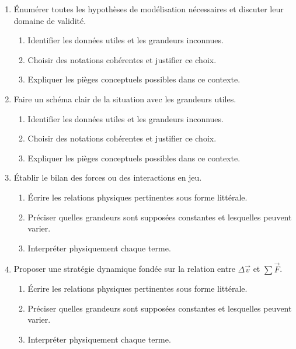 \documentclass[11pt,a4paper]{article}
\begin{document}
\begin{enumerate}[label=\textbf{Très long \arabic*.},leftmargin=*]
\begin{enumerate}[label=\textbf{\arabic*)}]
\begin{enumerate}[label=\alph*)]
\item Identifier les données utiles et les grandeurs inconnues.
\item Choisir des notations cohérentes et justifier ce choix.
\item Expliquer les pièges conceptuels possibles dans ce contexte.
\end{enumerate}
\item Énumérer toutes les hypothèses de modélisation nécessaires et discuter leur domaine de validité.
\begin{enumerate}[label=\alph*)]
\item Identifier les données utiles et les grandeurs inconnues.
\item Choisir des notations cohérentes et justifier ce choix.
\item Expliquer les pièges conceptuels possibles dans ce contexte.
\end{enumerate}
\item Faire un schéma clair de la situation avec les grandeurs utiles.
\begin{enumerate}[label=\alph*)]
\item Identifier les données utiles et les grandeurs inconnues.
\item Choisir des notations cohérentes et justifier ce choix.
\item Expliquer les pièges conceptuels possibles dans ce contexte.
\end{enumerate}
\item Établir le bilan des forces ou des interactions en jeu.
\begin{enumerate}[label=\alph*)]
\item Écrire les relations physiques pertinentes sous forme littérale.
\item Préciser quelles grandeurs sont supposées constantes et lesquelles peuvent varier.
\item Interpréter physiquement chaque terme.
\end{enumerate}
\item Proposer une stratégie dynamique fondée sur la relation entre $\Delta\vec v$ et $\sum\vec F$.
\begin{enumerate}[label=\alph*)]
\item Écrire les relations physiques pertinentes sous forme littérale.
\item Préciser quelles grandeurs sont supposées constantes et lesquelles peuvent varier.
\item Interpréter physiquement chaque terme.

\end{enumerate}
\end{enumerate}
\end{enumerate}
\end{document}
